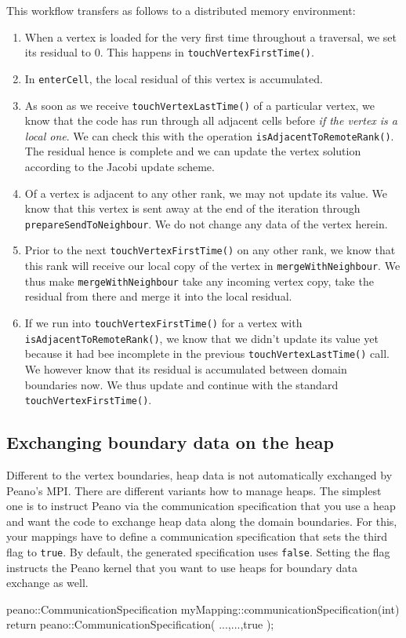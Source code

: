 \noindent
This workflow transfers as follows to a distributed memory environment:
\begin{enumerate}
  \item When a vertex is loaded for the very first time throughout a traversal,
  we set its residual to $0$. This happens in \texttt{touchVertexFirstTime()}.
  \item In \texttt{enterCell}, the local residual of this vertex is accumulated.
  \item As soon as we receive \texttt{touchVertexLastTime()} of a particular
  vertex, we know that the code has run through all adjacent cells before {\em
  if the vertex is  a local one}. We can check this with the operation
  \texttt{isAdjacentToRemoteRank()}. The residual hence is complete and we can update the
  vertex solution according to the Jacobi update scheme.
  \item Of a vertex is adjacent to any other rank, we may not update its value.
  We know that this vertex is sent away at the end of the iteration through 
  \texttt{prepareSendToNeighbour}. We do not change any data of the vertex
  herein.
  \item Prior to the next \texttt{touchVertexFirstTime()} on any other rank, we
  know that this rank will receive our local copy of the vertex in
  \texttt{mergeWithNeighbour}. We thus make \linebreak
  \texttt{mergeWithNeighbour} take any
  incoming vertex copy, take the residual from there and merge it into the local
  residual.
  \item If we run into \texttt{touchVertexFirstTime()} for a vertex with
  \texttt{isAdjacentToRemoteRank()}, we know that we didn't update its value yet
  because it had bee incomplete in the previous \texttt{touchVertexLastTime()}
  call. We however know that its residual is accumulated between domain
  boundaries now. We thus update and continue with the standard \linebreak
  \texttt{touchVertexFirstTime()}.
\end{enumerate}



\subsection{Exchanging boundary data on the heap}

Different to the vertex boundaries, heap data is not automatically exchanged by
Peano's MPI. 
There are different variants how to manage heaps. 
The simplest one is to instruct Peano via the communication specification that
you use a heap and want the code to exchange heap data along the domain
boundaries.
For this, your mappings have to define a communication specification
that sets the third flag to \texttt{true}.
By default, the generated specification uses \texttt{false}. 
Setting the flag instructs the Peano kernel that you want to use
heaps for boundary data exchange as well.
\begin{code}
peano::CommunicationSpecification  
myMapping::communicationSpecification(int) { 
  return peano::CommunicationSpecification( ...,...,true );
}
\end{code}

